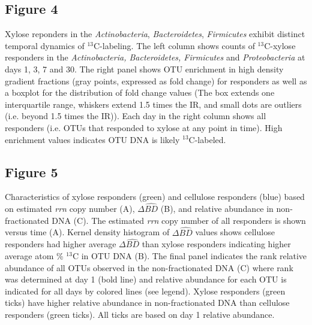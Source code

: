 \subsection{Figure 4}
Xylose reponders in the \textit{Actinobacteria}, \textit{Bacteroidetes},
\textit{Firmicutes} exhibit distinct temporal dynamics of $^{13}$C-labeling.
The left column shows counts of $^{13}$C-xylose responders in the
\textit{Actinobacteria, Bacteroidetes, Firmicutes} and \textit{Proteobacteria}
at days 1, 3, 7 and 30. The right panel shows OTU enrichment in high density
gradient fractions (gray points, expressed as fold change) for responders
as well as a boxplot for the distribution of fold change values
(The box extends one interquartile range, whiskers extend 1.5 times
the IR, and small dots are outliers (i.e. beyond 1.5 times the IR)).
Each day in the right column shows all responders (i.e.
OTUs that responded to xylose at any point in time). High enrichment values 
indicates OTU DNA is likely $^{13}$C-labeled.
    
\subsection{Figure 5}
Characteristics of xylose responders (green) and cellulose responders (blue)
based on estimated \textit{rrn} copy number (A), $\Delta\hat{BD}$ (B), and
relative abundance in non-fractionated DNA (C). The estimated \textit{rrn} copy
number of all responders is shown versus time (A). Kernel density histogram of
$\Delta\hat{BD}$ values shows cellulose responders had higher average
$\Delta\hat{BD}$ than xylose responders indicating higher average atom \%
$^{13}$C in OTU DNA (B). The final panel indicates the rank relative abundance
of all OTUs observed in the non-fractionated DNA (C) where rank was determined
at day 1 (bold line) and relative abundance for each OTU is indicated for all
days by colored lines (see legend). Xylose responders (green ticks) have higher
relative abundance in non-fractionated DNA than cellulose responders (green ticks). 
All ticks are based on day 1 relative abundance.
